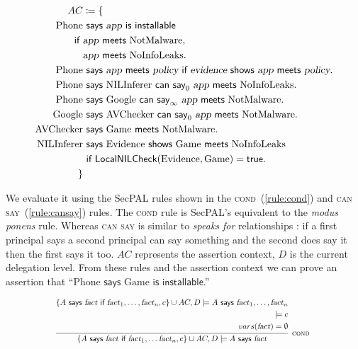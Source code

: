 \documentclass[]{llncs}
\newcommand{\keyword}[1]{\textsf{#1}}
\newcommand{\entity}[1]{\textrm{#1}}
\newcommand{\vari}[1]{\textsl{#1}}
\newcommand{\says}{\keyword{~says~}}
\newcommand{\cansay}[1]{\keyword{~can say}_{#1}~}
\newcommand{\iffacts}{\keyword{~if~}}
\newcommand{\meets}{\keyword{~meets~}}
\newcommand{\shows}{\keyword{~shows~}}
\newcommand{\installable}{\keyword{~is installable}}
\newcommand{\Phone}{\entity{Phone}}
\newcommand{\Nll}{\entity{NoInfoLeaks}}
\newcommand{\Nlli}{\entity{NILInferer}}
\newcommand{\Nm}{\entity{NotMalware}}
\newcommand{\Avc}{\entity{AVChecker}}
\newcommand{\Google}{\entity{Google}}
\newcommand{\App}{\entity{Game}}
\newcommand{\Evi}{\entity{Evidence}}
\newcommand{\LocalChecks}[2]{\textsf{Local#2Check}{\left(#1\right)}}
\newcommand{\app}{\vari{app}}
\newcommand{\policy}{\vari{policy}}
\newcommand{\evi}{\vari{evidence}}
\newcommand{\fact}{\vari{fact}}
\newcommand{\rrule}[1]{\textsc{\small #1}}
\newcommand{\rcond}[1]{\rrule{cond #1}}
\newcommand{\eref}[1]{(\ref{#1})}
\begin{document}
\begin{align}
    AC & \coloneqq \left\{ \right. \nonumber\\
    \Phone&\says \app\installable \nonumber\\
    \iffacts&\app\meets\Nm, \nonumber\\
            &\app\meets\Nll.
  \label{sp:DevicePolicy}\\
    \Phone&\says \app\meets\policy \iffacts \evi\shows\app\meets\policy.
  \label{sp:showsmeets}\\
    \Phone&\says\Nlli\cansay 0\app\meets\Nll.
  \label{sp:NlliCanSayNll}\\
    \Phone&\says
    \Google\cansay\infty
    \app\meets\Nm.
  \label{sp:GoogleCanSayNm}\\
    \Google&\says\Avc\cansay 0\app\meets\Nm.
  \label{sp:AvcCanSayNm}\\
    \Avc&\says\App\meets\Nm.
  \label{sp:AvcSaysNm}\\
    \Nlli&\says\Evi\shows\App\meets\Nll \nonumber\\
         & \iffacts \LocalChecks{\Evi,  \App}{NIL}=\textsf{true}.
  \label{sp:NlliSaysEviShowsAppPol}\\
  \left.\right\}\nonumber
\end{align}

We evaluate it using the SecPAL rules shown in the
\textsc{cond}~\eref{rule:cond} and \textsc{can say}~\eref{rule:cansay} rules.
The \textsc{cond} rule is SecPAL's equivalent to the \emph{modus ponens} rule.
Whereas \textsc{can say} is similar to \emph{speaks for} relationships
\cite{Abadi:2003kta}:  if a first principal says a second principal can say
something and the second does say it then the first says it too. $AC$
represents the assertion context, $D$ is the current delegation level. From
these rules and the assertion context we can prove an assertion that
``\(\Phone\says\App\installable\).''

\begin{equation}
  \scalebox{0.8}{%
  \infer[\rcond{}]{%
    \left\{A\says\fact\iffacts\fact_1,  \dots\fact_n,  c\right\}\cup AC,  D \models
      A\says\fact
  }{%
    \begin{split}
    \left\{A\says\fact\iffacts\fact_1,  \dots,  \fact_n,  c\right\}\cup AC,  D \models
      A\says\fact_1,  \dots,  \fact_n \\
    \models c \\
    vars(\fact) = \emptyset
    \end{split}
  }}
  \label{rule:cond}\\
\end{equation}
\end{document}
